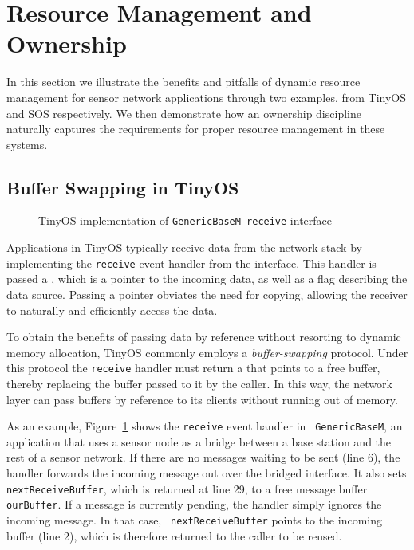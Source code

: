 \section{Resource Management and Ownership}
\label{sec:example}

In this section we illustrate the benefits and pitfalls of dynamic
resource management for sensor network applications through two
examples, from TinyOS and SOS respectively.  We then demonstrate how
an ownership discipline naturally captures the requirements for proper
resource management in these systems.

\subsection{Buffer Swapping in TinyOS}

\begin{figure}[t]

\caption{TinyOS implementation of {\tt GenericBaseM receive}
interface\label{fig:genericbase}}
\end{figure}

Applications in TinyOS typically receive data from the network stack
by implementing the {\tt receive} event handler from the
 interface.  This handler is passed a
, which is a pointer to the incoming data, as well
as a flag describing the data source.  Passing a pointer 
obviates the need for copying, 
allowing the receiver to naturally and efficiently access the data.

To obtain the benefits of passing data by reference without resorting
to dynamic memory allocation, TinyOS commonly
employs a {\em buffer-swapping} protocol.  Under this protocol the
{\tt receive} handler must return a  that points to
a free buffer, thereby replacing the buffer passed to it by the caller.
In this way, the network layer can pass buffers by reference to its
clients without running out of memory.

As an example, 
Figure~\ref{fig:genericbase} shows 
the {\tt receive} event handler in {\tt
GenericBaseM}, an application that uses a sensor node as a bridge
between a base station and the rest of a sensor network.  
If there are no messages waiting to be sent (line 6), the handler
forwards the incoming message out over the bridged interface.  It also sets
{\tt nextReceiveBuffer}, which is returned at line 29, to a free
message buffer {\tt ourBuffer}.  If a message is currently pending,
the handler simply ignores the incoming message.  In that case, {\tt
  nextReceiveBuffer} points to the incoming buffer (line 2), which
is therefore returned to the caller to be reused.

